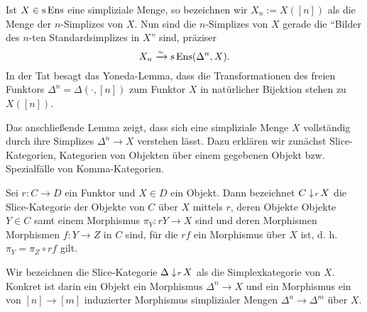 Ist $X \in \operatorname{s}\operatorname{Ens}$ eine simpliziale Menge, so bezeichnen wir $X_n :=
X([n])$ als die Menge der $n$-Simplizes von $X$. Nun sind die
$n$-Simplizes von $X$ gerade die ``Bilder des $n$-ten
Standardsimplizes in $X$'' sind, präziser
\[ X_n \xrightarrow{\sim} \operatorname{s}\operatorname{Ens}(\Delta^n, X). \]
In der Tat besagt das Yoneda-Lemma, dass die Transformationen des
freien Funktors $\Delta^n = \Delta(\cdot, [n])$ zum Funktor $X$ in
natürlicher Bijektion stehen zu $X([n])$.

Das anschließende Lemma zeigt, dass sich eine simpliziale Menge $X$
vollständig durch ihre Simplizes $\Delta^n \to X$ verstehen
lässt. Dazu erklären wir zunächst Slice-Kategorien, Kategorien von
Objekten über einem gegebenen Objekt bzw. Spezialfälle von
Komma-Kategorien.
\begin{defn}
  Sei $r: C \to D$ ein Funktor und $X \in D$ ein Objekt. Dann
  bezeichnet $C \downarrow \! {\scriptstyle r} \, X$ die Slice-Kategorie der Objekte von
  $C$ über $X$ mittels $r$, deren Objekte Objekte $Y \in C$ samt einem
  Morphismus $\pi_Y: rY \to X$ sind und deren Morphismen Morphismen
  $f: Y \to Z$ in $C$ sind, für die $rf$ ein Morphismus über $X$ ist,
  d. h. $\pi_Y = \pi_Z \circ rf$ gilt.
\end{defn}
Wir bezeichnen die Slice-Kategorie $\Delta \downarrow \! {\scriptstyle r} \, X$ als die
Simplexkategorie von $X$. Konkret ist darin ein Objekt ein Morphismus
$\Delta^n \to X$ und ein Morphismus ein von $[n] \to [m]$ induzierter
Morphismus simplizialer Mengen $\Delta^n \to \Delta^m$ über $X$.

